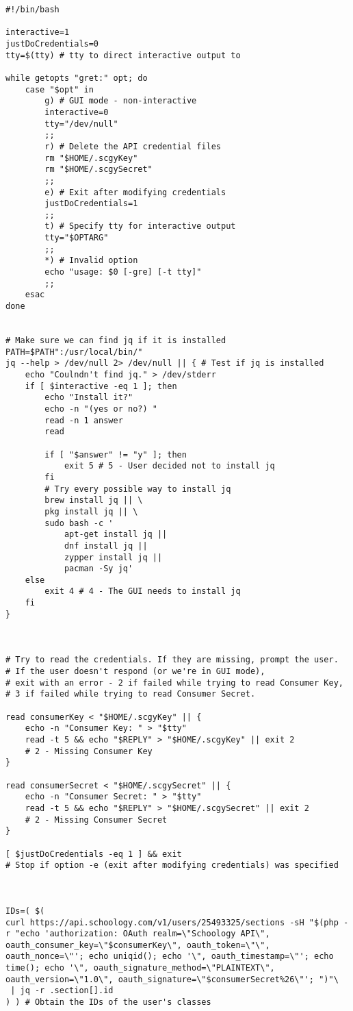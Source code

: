 \begin{lstlisting}
#!/bin/bash

interactive=1
justDoCredentials=0
tty=$(tty) # tty to direct interactive output to

while getopts "gret:" opt; do
	case "$opt" in
		g) # GUI mode - non-interactive
		interactive=0
		tty="/dev/null"
		;;
		r) # Delete the API credential files
		rm "$HOME/.scgyKey"
		rm "$HOME/.scgySecret"
		;;
		e) # Exit after modifying credentials
		justDoCredentials=1
		;;
		t) # Specify tty for interactive output
		tty="$OPTARG"
		;;
		*) # Invalid option
		echo "usage: $0 [-gre] [-t tty]"
		;;
	esac
done


# Make sure we can find jq if it is installed
PATH=$PATH":/usr/local/bin/"
jq --help > /dev/null 2> /dev/null || { # Test if jq is installed
	echo "Coulndn't find jq." > /dev/stderr
	if [ $interactive -eq 1 ]; then
		echo "Install it?"
		echo -n "(yes or no?) "
		read -n 1 answer
		read

		if [ "$answer" != "y" ]; then
			exit 5 # 5 - User decided not to install jq
		fi
		# Try every possible way to install jq
		brew install jq || \
		pkg install jq || \
		sudo bash -c '
			apt-get install jq ||
			dnf install jq ||
			zypper install jq ||
			pacman -Sy jq'
	else
		exit 4 # 4 - The GUI needs to install jq
	fi
}



# Try to read the credentials. If they are missing, prompt the user.
# If the user doesn't respond (or we're in GUI mode),
# exit with an error - 2 if failed while trying to read Consumer Key,
# 3 if failed while trying to read Consumer Secret.

read consumerKey < "$HOME/.scgyKey" || {
	echo -n "Consumer Key: " > "$tty"
	read -t 5 && echo "$REPLY" > "$HOME/.scgyKey" || exit 2
	# 2 - Missing Consumer Key
}

read consumerSecret < "$HOME/.scgySecret" || {
	echo -n "Consumer Secret: " > "$tty"
	read -t 5 && echo "$REPLY" > "$HOME/.scgySecret" || exit 2
	# 2 - Missing Consumer Secret
}

[ $justDoCredentials -eq 1 ] && exit
# Stop if option -e (exit after modifying credentials) was specified



IDs=( $(
curl https://api.schoology.com/v1/users/25493325/sections -sH "$(php -r "echo 'authorization: OAuth realm=\"Schoology API\", oauth_consumer_key=\"$consumerKey\", oauth_token=\"\", oauth_nonce=\"'; echo uniqid(); echo '\", oauth_timestamp=\"'; echo time(); echo '\", oauth_signature_method=\"PLAINTEXT\", oauth_version=\"1.0\", oauth_signature=\"$consumerSecret%26\"'; ")"\
 | jq -r .section[].id
) ) # Obtain the IDs of the user's classes


\end{lstlisting}
